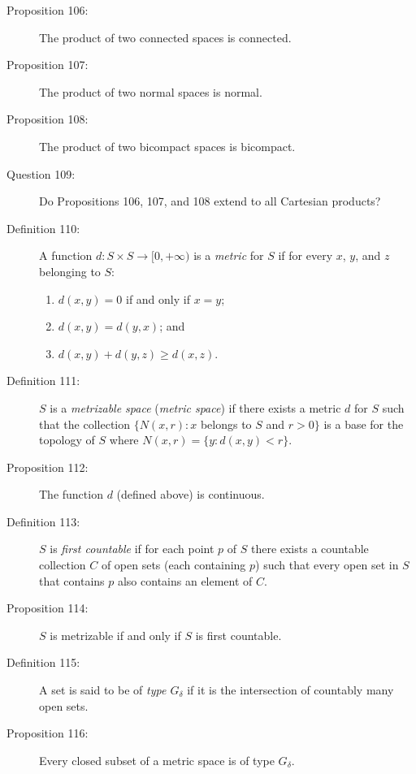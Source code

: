 \documentclass{article}
\begin{document}
\begin{description}
  \item[Proposition 106:] The product of two connected spaces is connected.

  \item[Proposition 107:] The product of two normal spaces is normal.

  \item[Proposition 108:] The product of two bicompact spaces is bicompact.

  \item[Question 109:] Do Propositions 106, 107, and 108 extend to all Cartesian products?

  \item[Definition 110:] A function $d: S\times S \rightarrow [0,+\infty)$ is a \emph{metric} for $S$ if for every $x$, $y$, and $z$ belonging to $S$:
    \begin{enumerate}[\hspace{1cm}1.]
      \item $d(x,y) = 0$ if and only if $x = y$;
      \item $d(x,y) = d(y,x)$; and
      \item $d(x,y) + d(y,z) \geq d(x,z)$.
    \end{enumerate}

  \item[Definition 111:] $S$ is a \emph{metrizable space} (\emph{metric space}) if there exists a metric $d$ for $S$ such that the collection $\{ N(x,r): x$ belongs to $S$ and $r>0 \}$ is a base for the topology of $S$ where $N(x,r) = \{ y: d(x,y) < r \}$.

  \item[Proposition 112:] The function $d$ (defined above) is continuous.

  \item[Definition 113:] $S$ is \emph{first countable} if for each point $p$ of $S$ there exists a countable collection $C$ of open sets (each containing $p$) such that every open set in $S$ that contains $p$ also contains an element of $C$.

  \item[Proposition 114:] $S$ is metrizable if and only if $S$ is first countable.

  \item[Definition 115:] A set is said to be of \emph{type $G_{\delta}$} if it is the intersection of countably many open sets.

  \item[Proposition 116:] Every closed subset of a metric space is of type $G_{\delta}$.


\end{description}
\end{document}
